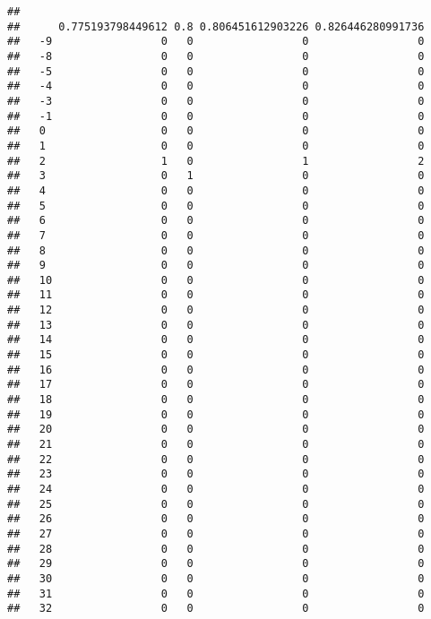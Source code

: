 \documentclass[]{article}
\begin{document}
\begin{verbatim}
##     
##      0.775193798449612 0.8 0.806451612903226 0.826446280991736
##   -9                 0   0                 0                 0
##   -8                 0   0                 0                 0
##   -5                 0   0                 0                 0
##   -4                 0   0                 0                 0
##   -3                 0   0                 0                 0
##   -1                 0   0                 0                 0
##   0                  0   0                 0                 0
##   1                  0   0                 0                 0
##   2                  1   0                 1                 2
##   3                  0   1                 0                 0
##   4                  0   0                 0                 0
##   5                  0   0                 0                 0
##   6                  0   0                 0                 0
##   7                  0   0                 0                 0
##   8                  0   0                 0                 0
##   9                  0   0                 0                 0
##   10                 0   0                 0                 0
##   11                 0   0                 0                 0
##   12                 0   0                 0                 0
##   13                 0   0                 0                 0
##   14                 0   0                 0                 0
##   15                 0   0                 0                 0
##   16                 0   0                 0                 0
##   17                 0   0                 0                 0
##   18                 0   0                 0                 0
##   19                 0   0                 0                 0
##   20                 0   0                 0                 0
##   21                 0   0                 0                 0
##   22                 0   0                 0                 0
##   23                 0   0                 0                 0
##   24                 0   0                 0                 0
##   25                 0   0                 0                 0
##   26                 0   0                 0                 0
##   27                 0   0                 0                 0
##   28                 0   0                 0                 0
##   29                 0   0                 0                 0
##   30                 0   0                 0                 0
##   31                 0   0                 0                 0
##   32                 0   0                 0                 0

\end{verbatim}
\end{document}
